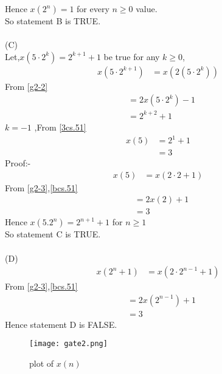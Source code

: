 \documentclass[journal,12pt,twocolumn]{IEEEtran}
\theoremstyle{remark}
\begin{document}
Hence $x(2^n)=1$ for every $n\geq0$ value.\\
So statement B is TRUE.\\
\\(C)\\
Let,$x(5\cdot2^k)=2^{k+1}+1$ be true for any $k\geq0$,
\begin{align}
	x(5\cdot2^{k+1})&=x(2(5\cdot2^k))
\end{align}
From \eqref{g2-2}
\begin{align}
	&=2x(5\cdot2^k)-1\\
	&=2^{k+2}+1\label{3cs.51}
\end{align}
$k=-1$ ,From \eqref{3cs.51}
\begin{align}
	x(5)&=2^1+1\\
	&=3
\end{align}
Proof:-
\begin{align}
        x(5)&=x(2\cdot2+1)
\end{align}
From \eqref{g2-3},\eqref{bcs.51}
\begin{align}
        &=2x(2)+1\\
        &=3
\end{align}
Hence $x(5.2^n)=2^{n+1}+1$ for $n\geq1$\\
So statement C is TRUE.\\
\\(D)
\begin{align}
	x(2^n+1)&=x(2\cdot2^{n-1}+1)
\end{align}
From \eqref{g2-3},\eqref{bcs.51}
\begin{align}
	&=2x(2^{n-1})+1\\
	&=3
\end{align}
Hence statement D is FALSE.
\begin{figure}
	\centering
	\texttt{[image: gate2.png]}
	\caption{plot of $x(n)$}
	\label{cs.51.stem}
\end{figure}
\end{document}
